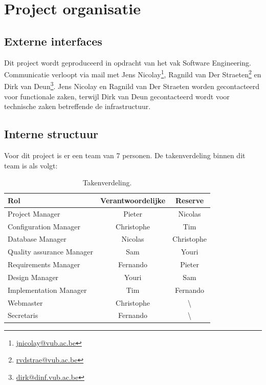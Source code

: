 \chapter{Project organisatie} \label{chap:ProjectOrganisatie}
\section{Externe interfaces}
Dit project wordt geproduceerd in opdracht van het vak Software Engineering. Communicatie verloopt via mail met Jens Nicolay\footnote{\href{mailto:jnicolay@vub.ac.be}{jnicolay@vub.ac.be}}, Ragnild van Der Straeten\footnote{\href{mailto:rvdstrae@vub.ac.be}{rvdstrae@vub.ac.be}} en Dirk van Deun\footnote{\href{mailto:dirk@dinf.vub.ac.be}{dirk@dinf.vub.ac.be}}. Jens Nicolay en Ragnild van Der Straeten worden gecontacteerd voor functionale zaken, terwijl Dirk van Deun gecontacteerd wordt voor technische zaken betreffende de infrastructuur.

\section{Interne structuur}
Voor dit project is er een team van 7 personen. De takenverdeling binnen dit team is als volgt:
\begin{table} [H]
	\centering
	\caption{Takenverdeling.}
	\begin{tabular} {l|cc}
		Rol & Verantwoordelijke & Reserve \\
		\hline
		Project Manager & Pieter & Nicolas \\
		Configuration Manager & Christophe & Tim \\
		Database Manager & Nicolas & Christophe \\
		Quality assurance Manager & Sam & Youri \\
		Requirements Manager & Fernando & Pieter \\
		Design Manager & Youri & Sam \\
		Implementation Manager & Tim & Fernando \\
		\hline
		Webmaster & Christophe & \textbackslash \\
		Secretaris & Fernando & \textbackslash 
	\end{tabular}
	\label{tab:takenverdeling}
\end{table}

